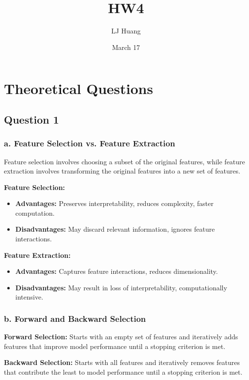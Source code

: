 \documentclass{article}
\title{HW4}
\author{LJ Huang}
\date{March 17}
\begin{document}
\maketitle

\section*{Theoretical Questions}

\subsection*{Question 1}

\subsubsection*{a. Feature Selection vs. Feature Extraction}

Feature selection involves choosing a subset of the original features, while feature extraction involves transforming the original features into a new set of features. 

\textbf{Feature Selection:}
\begin{itemize}
    \item \textbf{Advantages:} Preserves interpretability, reduces complexity, faster computation.
    \item \textbf{Disadvantages:} May discard relevant information, ignores feature interactions.
\end{itemize}

\textbf{Feature Extraction:}
\begin{itemize}
    \item \textbf{Advantages:} Captures feature interactions, reduces dimensionality.
    \item \textbf{Disadvantages:} May result in loss of interpretability, computationally intensive.
\end{itemize}

\subsubsection*{b. Forward and Backward Selection}

\textbf{Forward Selection:} Starts with an empty set of features and iteratively adds features that improve model performance until a stopping criterion is met.

\textbf{Backward Selection:} Starts with all features and iteratively removes features that contribute the least to model performance until a stopping criterion is met.
\end{document}
